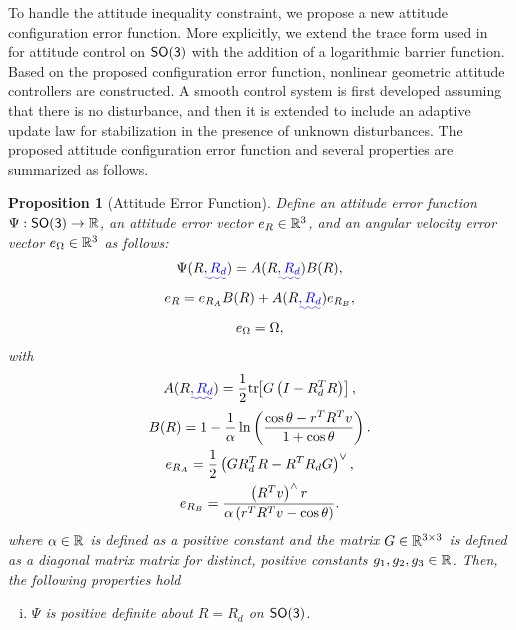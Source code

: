 \documentclass[10pt,fleqn]{IJCAS}  %
\newtheorem{prop}{Proposition}
\providecommand{\DIFadd}[1]{{\protect\color{blue}\uwave{#1}}} %
\providecommand{\DIFaddbegin}{} %
\providecommand{\DIFaddend}{} %
\begin{document}
\begin{multicols}{2}
To handle the attitude inequality constraint, we propose a new attitude configuration error function. 
More explicitly, we extend the trace form used in~\cite{bullo2004,LeeITCST13} for attitude control on \(\mathsf{SO(3)}\) with the addition of a logarithmic barrier function. 
Based on the proposed configuration error function,  nonlinear geometric attitude controllers are constructed. 
A smooth control system is first developed assuming that there is  no disturbance, and then it is extended to include an adaptive update law for stabilization in the presence of unknown disturbances. 
The proposed attitude configuration error function and several properties are summarized as follows.

\begin{prop}[Attitude Error Function] \label{prop:config_error}
Define an attitude error function \( \Psi : \mathsf{SO(3)} \to \mathbb{R} \), an attitude error vector \( e_R \in \mathbb{R}^3 \), and an angular velocity error vector \( e_\Omega \in \mathbb{R}^3 \) as follows:
\begin{gather}
	\Psi(R\DIFaddbegin \DIFadd{, R_d}\DIFaddend ) = A(R\DIFaddbegin \DIFadd{, R_d}\DIFaddend ) B(R) , \label{eqn:psi} \\
	e_R = e_{R_A} B(R) + A(R\DIFaddbegin \DIFadd{,R_d}\DIFaddend ) e_{R_B} , \label{eqn:eR} \\
	e_\Omega = \Omega , \label{eqn:eW}
\end{gather}
with
\begin{gather}
	A(R\DIFaddbegin \DIFadd{,R_d}\DIFaddend ) = \frac{1}{2} \tr{G \left( I - R_d^T R\right)} , \label{eqn:A} \\
	B(R) = 1 - \frac{1}{\alpha} \ln \left( \frac{\cos \theta -  r^T R^T v}{1 + \cos \theta}\right) . \label{eqn:B} \\
	e_{R_A} = \frac{1}{2} \parenth{G R_d^T R - R^T R_d G} ^ \vee , \label{eqn:eRA} \\
	e_{R_B} = \frac{ \left( R^T v\right)^\wedge r}{\alpha \left(r^T R^T v - \cos \theta \right)} . \label{eqn:eRB} 
\end{gather}	
where \( \alpha \in \mathbb{R} \) is defined as a positive constant and the matrix \( G \in \mathbb{R}^{3 \times 3} \) is defined as a diagonal matrix matrix for distinct, positive constants \( g_1, g_2, g_3 \in \mathbb{R} \).
Then, the following properties hold
\begin{enumerate}[(i)]
	\item \label{item:prop_psi_psd} \(\Psi\) is positive definite about \( R = R_d\) on $\mathsf{SO(3)}$.

\end{enumerate}
\end{prop}
\end{multicols}
\end{document}

